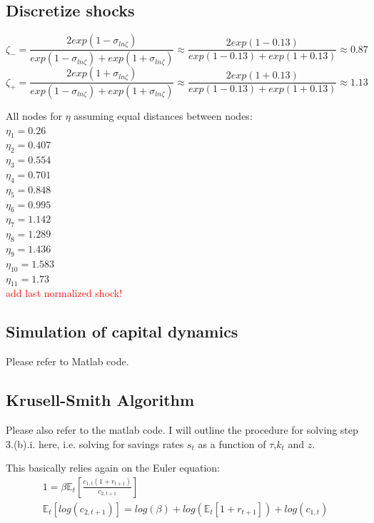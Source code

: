 \documentclass[12pt,a4paper]{article}
\begin{document}
\subsection{Discretize shocks}

\begin{equation*}
    \zeta_-=\frac{2exp(1-\sigma_{ln\zeta})}{exp(1-\sigma_{ln\zeta})+exp(1+\sigma_{ln\zeta})}\approx\frac{2exp(1-0.13)}{exp(1-0.13)+exp(1+0.13)}\approx 0.87
    \end{equation*}
    \begin{equation*}
       \zeta_+=\frac{2exp(1+\sigma_{ln\zeta})}{exp(1-\sigma_{ln\zeta})+exp(1+\sigma_{ln\zeta})}\approx\frac{2exp(1+0.13)}{exp(1-0.13)+exp(1+0.13)}\approx 1.13
    \end{equation*}

\vspace{1cm}


All nodes for $\eta$ assuming equal distances between nodes: \\
$\eta_1 = 0.26 $ \\
$\eta_2 = 0.407$ \\
$\eta_3 = 0.554$ \\
$\eta_4 = 0.701$ \\
$\eta_5 = 0.848$ \\
$\eta_6 = 0.995$ \\
$\eta_7 = 1.142$ \\
$\eta_8 = 1.289$ \\
$\eta_9 = 1.436$ \\
$\eta_{10} = 1.583$ \\
$\eta_{11} = 1.73$ \\

\textcolor{red}{add last normalized shock!}

\subsection{Simulation of capital dynamics}
Please refer to Matlab code.

\subsection{Krusell-Smith Algorithm}
Please also refer to the matlab code. I will outline the procedure for solving step 3.(b).i. here, i.e. solving for savings rates $s_t$ as a function of $\tau$,$k_t$ and $z$.

This basically relies again on the Euler equation:
\begin{align*}
          1 = \beta \mathbb{E}_t \left[ \frac{c_{1,t} (1+r_{t+1})}{c_{2,t+1}} \right]\\
          \mathbb{E}_t\left[log\left(c_{2,t+1}\right)\right] = log\left(\beta\right) + log\left( \mathbb{E}_t \left[1+r_{t+1}\right]\right)  + log\left( c_{1,t} \right)
\end{align*}
\end{document}
